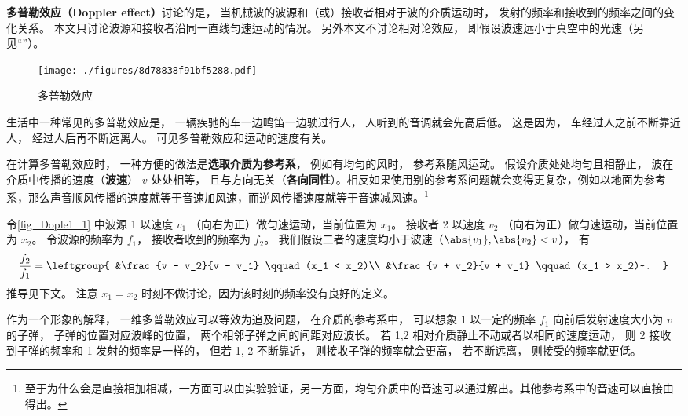

\textbf{多普勒效应（Doppler effect）}讨论的是， 当机械波的波源和（或）接收者相对于波的介质运动时， 发射的频率和接收到的频率之间的变化关系。 本文只讨论波源和接收者沿同一直线匀速运动的情况。 另外本文不讨论相对论效应， 即假设波速远小于真空中的光速（另见“”）。

\begin{figure}[ht]
\centering
\texttt{[image: ./figures/8d78838f91bf5288.pdf]}
\caption{多普勒效应} \label{fig_Dople1_1}
\end{figure}

\begin{example}{}
生活中一种常见的多普勒效应是， 一辆疾驰的车一边鸣笛一边驶过行人， 人听到的音调就会先高后低。 这是因为， 车经过人之前不断靠近人， 经过人后再不断远离人。 可见多普勒效应和运动的速度有关。
\end{example}

在计算多普勒效应时， 一种方便的做法是\textbf{选取介质为参考系}， 例如有均匀的风时， 参考系随风运动。 假设介质处处均匀且相静止， 波在介质中传播的速度（\textbf{波速}） $v$ 处处相等， 且与方向无关（\textbf{各向同性}）。相反如果使用别的参考系问题就会变得更复杂，例如以地面为参考系，那么声音顺风传播的速度就等于音速加风速，而逆风传播速度就等于音速减风速。\footnote{至于为什么会是直接相加相减，一方面可以由实验验证，另一方面，均匀介质中的音速可以通过解出。其他参考系中的音速可以直接由得出。}

令\autoref{fig_Dople1_1} 中波源 1 以速度 $v_1$ （向右为正）做匀速运动，当前位置为 $x_1$。 接收者 2 以速度 $v_2$ （向右为正）做匀速运动，当前位置为 $x_2$。 令波源的频率为 $f_1$， 接收者收到的频率为 $f_2$。 我们假设二者的速度均小于波速（$\abs{v_1}, \abs{v_2} < v$）， 有
\begin{equation}\label{eq_Dople1_1}
\frac{f_2}{f_1} = \leftgroup{
&\frac{v - v_2}{v - v_1} \qquad (x_1 < x_2)\\
&\frac{v + v_2}{v + v_1} \qquad (x_1 > x_2)~.
}\end{equation}
推导见下文。 注意 $x_1=x_2$ 时刻不做讨论，因为该时刻的频率没有良好的定义。

作为一个形象的解释， 一维多普勒效应可以等效为追及问题， 在介质的参考系中， 可以想象 1 以一定的频率 $f_1$ 向前后发射速度大小为 $v$ 的子弹， 子弹的位置对应波峰的位置， 两个相邻子弹之间的间距对应波长。 若 1,2 相对介质静止不动或者以相同的速度运动， 则 2 接收到子弹的频率和 1 发射的频率是一样的， 但若 1, 2 不断靠近， 则接收子弹的频率就会更高， 若不断远离， 则接受的频率就更低。

